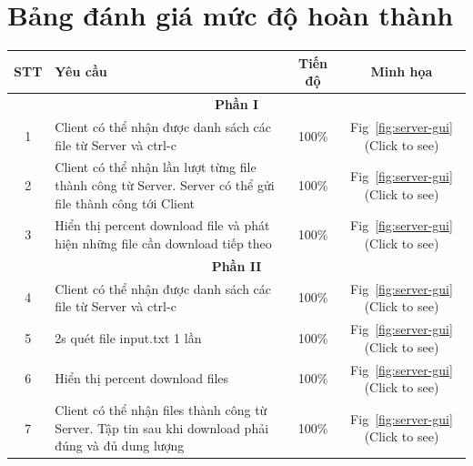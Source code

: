 \documentclass[a4paper,12pt]{report}
\begin{document}
\section{Bảng đánh giá mức độ hoàn thành}
\begin{center}
  \renewcommand{\arraystretch}{1.5}
  \begin{tabular}{|c|p{}|c|c|}
    \hline
    \textbf{STT} & \textbf{Yêu cầu}                                                                                         & \textbf{Tiến độ} & \textbf{Minh họa}                       \\\hline
    \multicolumn{4}{|c|}{\textbf{Phần I}}                                                                                                                                                \\\hline
    1            & Client có thể nhận được danh sách các file từ Server và ctrl-c                                           & 100\%            & Fig~\ref{fig:server-gui} (Click to see) \\\hline
    2            & Client có thể nhận lần lượt từng file thành công từ Server. Server có thể gửi file thành công tới Client & 100\%            & Fig~\ref{fig:server-gui} (Click to see) \\\hline
    3            & Hiển thị percent download file và phát hiện những file cần download tiếp theo                            & 100\%            & Fig~\ref{fig:server-gui} (Click to see) \\\hline
    \multicolumn{4}{|c|}{\textbf{Phần II}}                                                                                                                                               \\\hline
    4            & Client có thể nhận được danh sách các file từ Server và ctrl-c                                           & 100\%            & Fig~\ref{fig:server-gui} (Click to see) \\\hline
    5            & 2s quét file input.txt 1 lần                                                                             & 100\%            & Fig~\ref{fig:server-gui} (Click to see) \\\hline
    6            & Hiển thị percent download files                                                                          & 100\%            & Fig~\ref{fig:server-gui} (Click to see) \\\hline
    7            & Client có thể nhận files thành công từ Server. Tập tin sau khi download phải đúng và đủ dung lượng       & 100\%            & Fig~\ref{fig:server-gui} (Click to see) \\\hline

\end{tabular}
\end{center}
\end{document}
